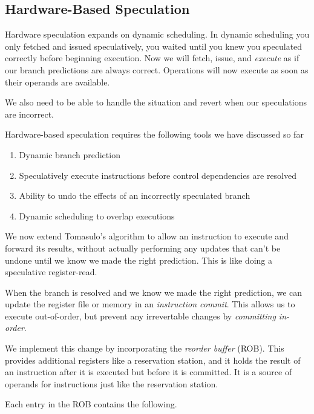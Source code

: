 \documentclass{article}
\begin{document}
\subsection{Hardware-Based Speculation}

Hardware speculation expands on dynamic scheduling. In dynamic scheduling you only fetched and issued speculatively, you waited until you knew you speculated correctly before beginning execution. Now we will fetch, issue, and \textit{execute} as if our branch predictions are always correct. Operations will now execute as soon as their operands are available. 

We also need to be able to handle the situation and revert when our speculations are incorrect. 

Hardware-based speculation requires the following tools we have discussed so far

\begin{enumerate}
\item Dynamic branch prediction

\item Speculatively execute instructions before control dependencies are resolved

\item Ability to undo the effects of an incorrectly speculated branch

\item Dynamic scheduling to overlap executions
\end{enumerate}

We now extend Tomasulo's algorithm to allow an instruction to execute and forward its results, without actually performing any updates that can't be undone until we know we made the right prediction. This is like doing a speculative register-read. 

When the branch is resolved and we know we made the right prediction, we can update the register file or memory in an \textit{instruction commit}. This allows us to execute out-of-order, but prevent any irrevertable changes by \textit{committing in-order}. 

We implement this change by incorporating the \textit{reorder buffer} (ROB). This provides additional registers like a reservation station, and it holds the result of an instruction after it is executed but before it is committed. It is a source of operands for instructions just like the reservation station. 

Each entry in the ROB contains the following.
\end{document}
